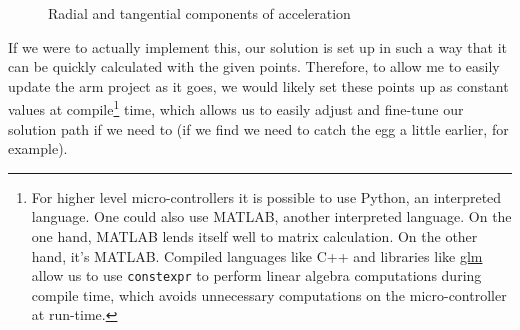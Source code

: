 \documentclass[nofoot,pdf-a,balance,colorlinks,upint,subscriptcorrection,varvw,mathalfa=cal=boondoxo]{asmeconf}
\begin{document}
        \begin{figure}[H]
            \centering

            \caption{Radial and tangential components of acceleration}\label{actuatorAccel2D}
        \end{figure}


        If we were to actually implement this, our solution is set up in such a way that it can be quickly calculated with the given points. Therefore, to allow me to easily update the arm project as it goes, we would likely set these points up as constant values at compile\footnote{For higher level micro-controllers it is possible to use Python, an interpreted language. One could also use MATLAB, another interpreted language. On the one hand, MATLAB lends itself well to matrix calculation. On the other hand, it's MATLAB. Compiled languages like C++ and libraries like \href{https://github.com/g-truc/glm}{glm} allow us to use \texttt{constexpr} to perform linear algebra computations during compile time, which avoids unnecessary computations on the micro-controller at run-time.} time, which allows us to easily adjust and fine-tune our solution path if we need to (if we find we need to catch the egg a little earlier, for example).

	
\end{document}
